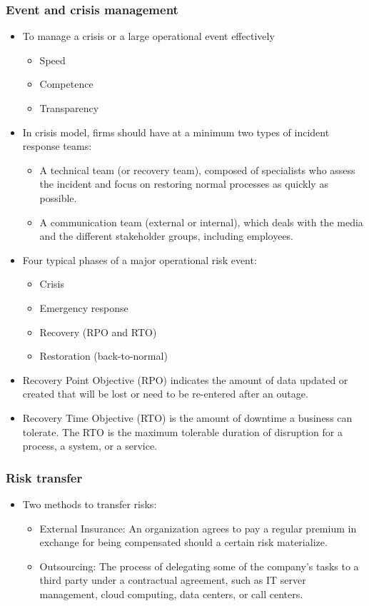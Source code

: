 \subsubsection{Event and crisis management}
\begin{itemize}
\item To manage a crisis or a large operational event effectively
    \begin{itemize}
    \item Speed
    \item  Competence
    \item  Transparency
    \end{itemize}
\item In crisis model, firms should have at a minimum two types of incident response teams:
    \begin{itemize}
    \item A technical team (or recovery team), composed of specialists who assess the incident and focus on restoring normal processes as quickly as possible.
    \item  A communication team (external or internal), which deals with the media and the different stakeholder groups, including employees.
    \end{itemize}
\item Four typical phases of a major operational risk event:
    \begin{itemize}
    \item Crisis
    \item  Emergency response
    \item  Recovery (RPO and RTO)
    \item  Restoration (back-to-normal)
    
    \end{itemize}
\item Recovery Point Objective (RPO) indicates the amount of data updated or created that will be lost or need to be re-entered after an outage.
\item Recovery Time Objective (RTO) is the amount of downtime a business can tolerate. The RTO is the maximum tolerable duration of disruption for a process, a system, or a service.
\end{itemize}


\subsubsection{Risk transfer}
\begin{itemize}
\item Two methods to transfer risks:
    \begin{itemize}
    \item External Insurance: An organization agrees to pay a regular premium in exchange for being compensated should a certain risk materialize.
    \item  Outsourcing: The process of delegating some of the company's tasks to a third party under a contractual agreement, such as IT server management, cloud computing, data centers, or call centers.
    \end{itemize}
\end{itemize}


